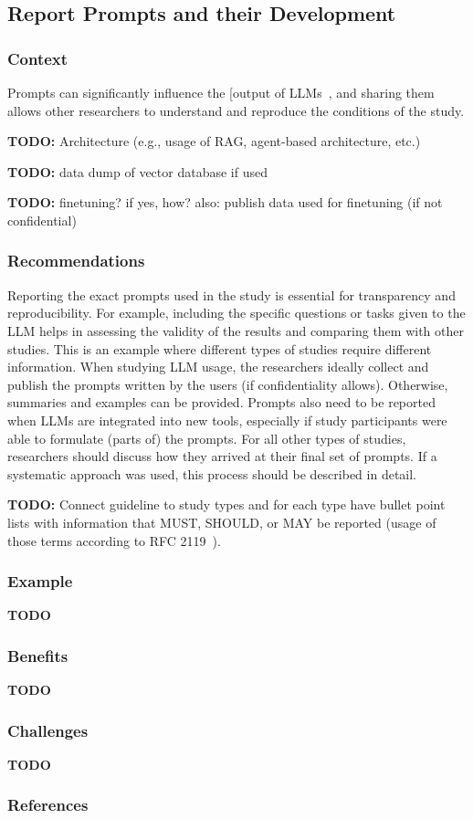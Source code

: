 \documentclass[11pt]{article}
\begin{document}
\subsection{Report Prompts and their Development}

\subsubsection{Context}

Prompts can significantly influence the [output of LLMs~\cite{DBLP:journals/tosem/LiuLWTLLL24}, and sharing them allows other researchers to understand and reproduce the conditions of the study.

\textbf{TODO:} Architecture (e.g., usage of RAG, agent-based architecture, etc.)

\textbf{TODO:} data dump of vector database if used

\textbf{TODO:} finetuning? if yes, how? also: publish data used for finetuning (if not confidential)

\subsubsection{Recommendations}

Reporting the exact prompts used in the study is essential for transparency and reproducibility.
For example, including the specific questions or tasks given to the LLM helps in assessing the validity of the results and comparing them with other studies.
This is an example where different types of studies require different information.
When studying LLM usage, the researchers ideally collect and publish the prompts written by the users (if confidentiality allows).
Otherwise, summaries and examples can be provided.
Prompts also need to be reported when LLMs are integrated into new tools, especially if study participants were able to formulate (parts of) the prompts.
For all other types of studies, researchers should discuss how they arrived at their final set of prompts.
If a systematic approach was used, this process should be described in detail.

\textbf{TODO:} Connect guideline to study types and for each type have bullet point lists with information that MUST, SHOULD, or MAY be reported (usage of those terms according to RFC 2119~\cite{rfc2119}).

\subsubsection{Example}

\textbf{TODO}

\subsubsection{Benefits}

\textbf{TODO}

\subsubsection{Challenges}

\textbf{TODO}

\subsubsection{References}



\end{document}
